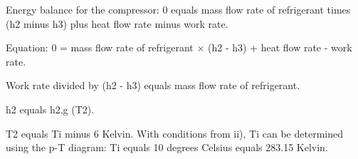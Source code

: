 Energy balance for the compressor:  
0 equals mass flow rate of refrigerant times (h2 minus h3) plus heat flow rate minus work rate.  

Equation:  
0 = mass flow rate of refrigerant × (h2 - h3) + heat flow rate - work rate.  

Work rate divided by (h2 - h3) equals mass flow rate of refrigerant.  

h2 equals h2,g (T2).  

T2 equals Ti minus 6 Kelvin.  
With conditions from ii), Ti can be determined using the p-T diagram:  
Ti equals 10 degrees Celsius equals 283.15 Kelvin.